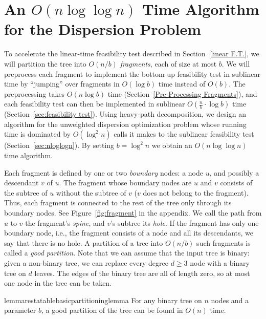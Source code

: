 \documentclass[a4paper,UKenglish]{lipics-v2016}
\theoremstyle{plain}
\begin{document}
\section{An \texorpdfstring{\boldmath$O(n\log\log n)$}{O(nloglogn)} Time Algorithm for the Dispersion Problem}
\label{sublinear f.t.}

To accelerate the linear-time feasibility test described in Section~\ref{linear F.T.}, we will partition the tree into $O(n/b)$ {\em fragments}, each of size at most
$b$. We will preprocess each fragment to implement the bottom-up feasibility test in sublinear time by  ``jumping'' over fragments in $O(\log b)$ time instead of $O(b)$.  The preprocessing takes $O(n\log b)$ time (Section~\ref{Pre-Processing Fragments}), and each feasibility test can then be implemented in sublinear $O(\frac{n}{b} \cdot \log b)$ time (Section~\ref{sec:feasibility test}). Using heavy-path decomposition, we design an algorithm for the unweighted dispersion optimization problem whose running time is dominated by $O(\log^{2}n)$ calls it makes to the sublinear feasibility test  (Section~\ref{sec:nloglogn}). By setting $b=\log^{2}n$ we obtain an $O(n\log\log n)$ time algorithm.


Each fragment is defined by one or two {\em boundary} nodes: a node $u$, and possibly a descendant $v$ of $u$. The fragment whose boundary nodes are $u$ and $v$ consists of the subtree of $u$ without the subtree of $v$ ($v$ does not belong to the fragment). Thus, each fragment is connected to the rest of the tree only through its boundary nodes. See Figure~\ref{fig:fragment} in the appendix. 
We call the path from $u$ to $v$ the fragment's \textit{spine}, and $v$'s subtree its \textit{hole}. If the
fragment has only one boundary node, i.e., the fragment consists of a node and all its descendants, we say that there is no hole.
A partition of a tree into $O(n/b)$ such fragments is called a \emph{good partition}.
Note that we can assume that the input tree is binary: given a non-binary tree, we can replace every degree $d\geq 3$ node with a binary tree on
$d$ leaves. The edges of the binary tree are all of length zero, so at most one node in the tree can be taken.

\begin{restatable}{lemmarestatable}{basicpartitioninglemma}
\label{basic partitioning lemma}
For any binary tree on $n$ nodes and a parameter $b$, a good partition of the tree can be found in $O(n)$ time.
\end{restatable}
\end{document}

